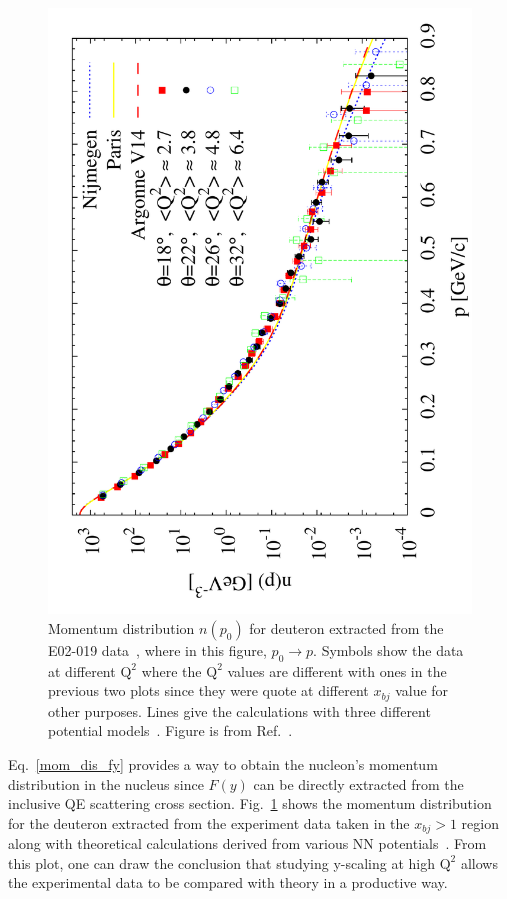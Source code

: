 \begin{figure}[!ht]
  \begin{center}
    \includegraphics[type=pdf,ext=.pdf,read=.pdf,angle=270,width=0.80\linewidth]{./figures/physics/SRC11_d_nk}
    \caption[Momentum distribution $n(p_{0})$ for deuteron]{\footnotesize{Momentum distribution $n(p_{0})$ for deuteron extracted from the E02-019 data~\cite{nadia_thesis,PhysRevLett.108.092502}, where in this figure, $p_{0}\rightarrow p$. Symbols show the data at different $\mathrm{Q^{2}}$ where the $\mathrm{Q^{2}}$ values are different with ones in the previous two plots since they were quote at different $x_{bj}$ value for other purposes. Lines give the calculations with three different potential models~\cite{PhysRevC.49.2950,Lacombe1981139, PhysRevC.51.38}. Figure is from Ref.~\cite{PhysRevLett.108.092502}.}}
    \label{mom_dis_deut}
  \end{center}
\end{figure}
Eq.~\eqref{mom_dis_fy} provides a way to obtain the nucleon's momentum distribution in the nucleus since $F(y)$ can be directly extracted from the inclusive QE scattering cross section. Fig.~\ref{mom_dis_deut} shows the momentum distribution for the deuteron extracted from the experiment data taken in the $x_{bj}>1$ region along with theoretical calculations derived from various NN potentials~\cite{nadia_thesis,PhysRevLett.108.092502}. From this plot, one can draw the conclusion that studying y-scaling at high $\mathrm{Q^{2}}$ allows the experimental data to be compared with theory in a productive way.

